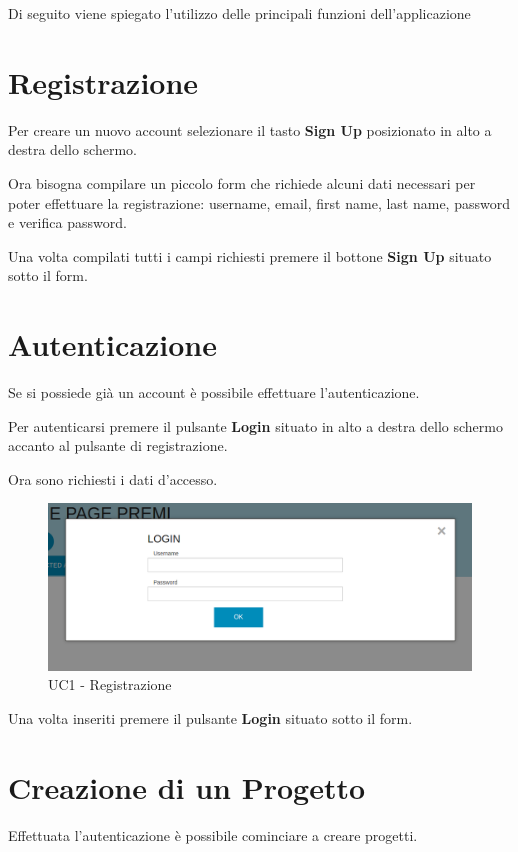 Di seguito viene spiegato l'utilizzo delle principali funzioni dell'applicazione
\section{Registrazione}
Per creare un nuovo account selezionare il tasto \textbf{Sign Up} posizionato in alto a destra dello schermo.

\noindent Ora bisogna compilare un piccolo form che richiede alcuni dati necessari per poter effettuare la registrazione: username, email, first name, last name, password e verifica password.

\noindent Una volta compilati tutti i campi richiesti premere il bottone \textbf{Sign Up} situato sotto il form.

\section{Autenticazione}
Se si possiede già un account è possibile effettuare l'autenticazione.

\noindent Per autenticarsi premere il pulsante \textbf{Login} situato in alto a destra dello schermo accanto al pulsante di registrazione.

\noindent Ora sono richiesti i dati d'accesso.

\begin{figure}[h] 
	\centering 
	\includegraphics[scale=0.40] {img/MULogin.png}
	\caption{UC1 - Registrazione} 
\end{figure}

\noindent Una volta inseriti premere il pulsante \textbf{Login} situato sotto il form.

\section{Creazione di un Progetto}

Effettuata l'autenticazione è possibile cominciare a creare progetti.


